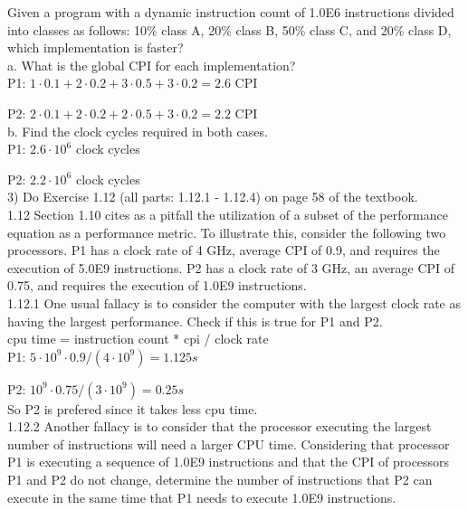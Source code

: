 Given a program with a dynamic instruction count of 1.0E6 instructions divided into classes as follows: 10\% class A, 20\% class B, 50\% class C, and 20\% class D, which implementation is faster? \\

a. What is the global CPI for each implementation? \\

P1: $1 \cdot 0.1 + 2 \cdot 0.2 + 3 \cdot 0.5 + 3 \cdot 0.2 = 2.6$ CPI

P2: $2 \cdot 0.1 + 2 \cdot 0.2 + 2 \cdot 0.5 + 3 \cdot 0.2 = 2.2$ CPI \\

b. Find the clock cycles required in both cases. \\

P1: $2.6 \cdot 10^6$ clock cycles

P2: $2.2 \cdot 10^6$ clock cycles \\


3) Do Exercise 1.12 (all parts: 1.12.1 - 1.12.4) on page 58 of the textbook. \\

1.12 Section 1.10 cites as a pitfall the utilization of a subset of the performance equation as a performance metric. To illustrate this, consider the following two processors. P1 has a clock rate of 4 GHz, average CPI of 0.9, and requires the execution of 5.0E9 instructions. P2 has a clock rate of 3 GHz, an average CPI of 0.75, and requires the execution of 1.0E9 instructions. \\

1.12.1 One usual fallacy is to consider the computer with the largest clock rate as having the largest performance. Check if this is true for P1 and P2. \\

cpu time = instruction count * cpi / clock rate \\

P1: $5 \cdot 10^9 \cdot 0.9 / (4 \cdot 10^9) = 1.125s$

P2: $10^9 \cdot 0.75 / (3 \cdot 10 ^ 9) = 0.25s$ \\

So P2 is prefered since it takes less cpu time. \\


1.12.2 Another fallacy is to consider that the processor executing the largest number of instructions will need a larger CPU time. Considering that processor P1 is executing a sequence of 1.0E9 instructions and that the CPI of processors P1 and P2 do not change, determine the number of instructions that P2 can execute in the same time that P1 needs to execute 1.0E9 instructions. \\

